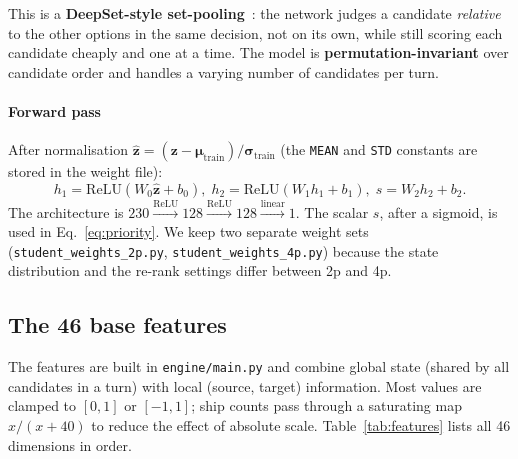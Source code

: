 \documentclass[conference]{IEEEtran}
\begin{document}
This is a \textbf{DeepSet-style set-pooling}~\cite{deepsets2017}: the network judges a candidate \textit{relative} to the other options in the same decision, not on its own, while still scoring each candidate cheaply and one at a time. The model is \textbf{permutation-invariant} over candidate order and handles a varying number of candidates per turn.

\paragraph{Forward pass}
After normalisation $\hat{\mathbf{z}} = (\mathbf{z} - \boldsymbol{\mu}_{\mathrm{train}}) / \boldsymbol{\sigma}_{\mathrm{train}}$ (the \texttt{MEAN} and \texttt{STD} constants are stored in the weight file):
\begin{equation}
h_1 = \mathrm{ReLU}(W_0 \hat{\mathbf{z}} + b_0),\;
h_2 = \mathrm{ReLU}(W_1 h_1 + b_1),\;
s = W_2 h_2 + b_2.
\end{equation}
The architecture is $230 \xrightarrow{\mathrm{ReLU}} 128 \xrightarrow{\mathrm{ReLU}} 128 \xrightarrow{\mathrm{linear}} 1$. The scalar $s$, after a sigmoid, is used in Eq.~\eqref{eq:priority}. We keep two separate weight sets (\texttt{student\_weights\_2p.py}, \texttt{student\_weights\_4p.py}) because the state distribution and the re-rank settings differ between 2p and 4p.

\subsection{The 46 base features}
\label{sec:features}

The features are built in \texttt{engine/main.py} and combine global state (shared by all candidates in a turn) with local (source, target) information. Most values are clamped to $[0,1]$ or $[-1,1]$; ship counts pass through a saturating map $x/(x+40)$ to reduce the effect of absolute scale. Table~\ref{tab:features} lists all 46 dimensions in order.
\end{document}
